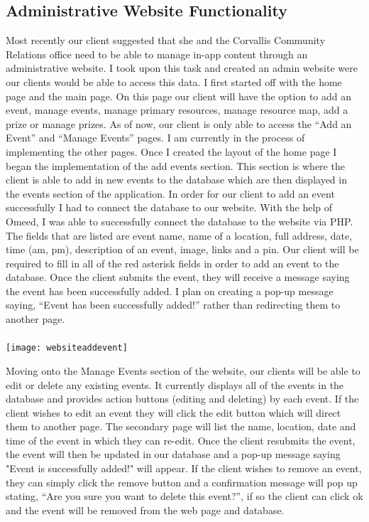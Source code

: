\documentclass[onecolumn, draftclsnofoot,10pt, compsoc]{IEEEtran}
\begin{document}
	\subsection{Administrative Website Functionality}
		Most recently our client suggested that she and the Corvallis Community Relations office need to be able to manage in-app content through an administrative website. I took upon this task and created an admin website were our clients would be able to access this data. I first started off with the home page and the main page. On this page our client will have the option to add an event, manage events, manage primary resources, manage resource map, add a prize or manage prizes. As of now, our client is only able to access the “Add an Event” and “Manage Events” pages. I am currently in the process of implementing the other pages. Once I created the layout of the home page I began the implementation of the add events section. This section is where the client is able to add in new events to the database which are then displayed in the events section of the application. In order for our client to add an event successfully I had to connect the database to our website. With the help of Omeed, I was able to successfully connect the database to the website via PHP. The fields that are listed are event name, name of a location, full address, date, time (am, pm), description of an event, image, links and a pin. Our client will be required to fill in all of the red asterisk fields in order to add an event to the database. Once the client submits the event, they will receive a message saying the event has been successfully added. I plan on creating a pop-up message saying, “Event has been successfully added!” rather than redirecting them to another page. \\ \\

		\texttt{[image: websiteaddevent]}

		Moving onto the Manage Events section of the website, our clients will be able to edit or delete any existing events. It currently displays all of the events in the database and provides action buttons (editing and deleting) by each event. If the client wishes to edit an event they will click the edit button which will direct them to another page. The secondary page will list the name, location, date and time of the event in which they can re-edit. Once the client resubmits the event, the event will then be updated in our database and a pop-up message saying "Event is successfully added!" will appear. If the client wishes to remove an event, they can simply click the remove button and a confirmation message will pop up stating, “Are you sure you want to delete this event?”, if so the client can click ok and the event will be removed from the web page and database. \\ \\
\end{document}
